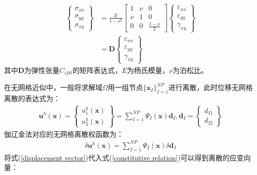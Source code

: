 \begin{equation}
\begin{split}
    \left\{\begin{matrix}
        \sigma_{xx}\\\sigma_{yy}\\\sigma_{xy}
        \end{matrix}\right\}&=\frac{E}{1-\nu^2}
        \left[\begin{matrix}
        1&\nu&0\\\nu&1&0\\0&0&\frac{1-\nu}{2}
        \end{matrix}\right]
        \left\{\begin{matrix}
        \varepsilon_{xx}\\\varepsilon_{yy}\\\gamma_{xy}
    \end{matrix}\right\}\\
    &=\pmb{D}\left\{\begin{matrix}\varepsilon_{xx}\\\varepsilon_{yy}\\\gamma_{xy}\end{matrix}\right\}
\end{split}
\end{equation}
其中$\pmb{D}$为弹性张量$C_{ijkl}$的矩阵表达式，$E$为杨氏模量，$\nu$为泊松比。\par
在无网格近似中，一般将求解域$\Omega$用一组节点$\{\pmb{x}_I\}_{I=1}^{N\!P}$进行离散，此时位移无网格离散的表达式为：
\begin{equation}\label{displacement vector}
\begin{split}
    \pmb{u}^h(\pmb{x})=\left\{\begin{matrix}u_1^h(\pmb{x})\\u_2^h(\pmb{x})
    \end{matrix}\right\}=\sum_{I=1}^{N\!P}\Psi_I(\pmb{x})\pmb d_I,\pmb{d}_I=\left\{\begin{matrix}d_{I1}\\d_{I2}\end{matrix}\right\}
\end{split}
\end{equation}
伽辽金法对应的无网格离散权函数为：
\begin{equation}
\begin{split}
    \delta\pmb{u}^h(\pmb{x})=\sum_{I=1}^{N\!P}\Psi_I(\pmb{x})\delta\pmb{d}_I
\end{split}
\end{equation}
将式(\ref{displacement vector})代入式(\ref{constitutive relation})可以得到离散的应变向量：
